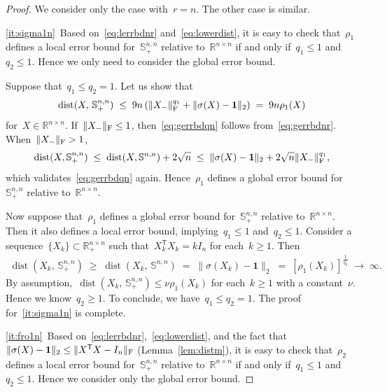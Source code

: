 \documentclass[11pt,a4paper]{article}  %
\theoremstyle{definition}
\DeclareMathOperator{\dist}{dist}
\newcommand{\RR}{\mathbb{R}}
\newcommand{\res}{\rho}
\newcommand{\col}{r}
\newcommand{\stf}[1]{\mathbb{S}^{#1}}
\newcommand{\fro}{{\scriptstyle{\textnormal{F}}}}
\newcommand{\trs}{{\scriptstyle{\mathsf{T}}}}
\newcommand{\ones}{\mathbf{1}}
\begin{document}
\begin{proof}
    We consider only the case with~$\col = n$. The other case is similar.

    \ref{it:sigma1n}~Based on~\eqref{eq:lerrbdnr} and~\eqref{eq:lowerdist}, it is easy to check
    that~$\res_1$ defines a local error bound for~$\stf{n,n}_+$ relative to~$\RR^{n\times n}$
    if and only if~$q_1 \le 1$ and~$q_2\le 1$.
    Hence we only need to consider the global error bound.

    Suppose that~$q_1 \le q_2 = 1$. Let us show that
    \begin{equation}
        \label{eq:gerrbdqn}
        \dist(X,\, \stf{n,n}_+)
        \;\le\; 9n\left( \|X_{-}\|_\fro^{q_1} + \|\sigma(X) -\ones\|_2 \right)
        \;=\; 9n\res_1(X)
    \end{equation}
    for~$X\in\RR^{n\times n}$.
    If~$\|X_{-}\|_\fro \le 1$, then~\eqref{eq:gerrbdqn} follows from~\eqref{eq:gerrbdnr}.
    When~$\|X_{-}\|_\fro > 1$,
    \begin{equation}
        \nonumber
        \dist(X, \stf{n, n}_+)
        \;\le\; \dist(X, \stf{n, n})  + 2\sqrt{n}
        \;\le\; \|\sigma(X) -\ones\|_2 + 2\sqrt{n}\|X_{-}\|_\fro^{q_1},
    \end{equation}
    which validates~\eqref{eq:gerrbdqn} again.
    Hence~$\res_1$ defines a global error bound for~$\stf{n,n}_+$ relative to~$\RR^{n\times n}$.

    Now suppose that~$\res_1$ defines a global error bound for~$\stf{n,n}_+$ relative
    to~$\RR^{n\times n}$. Then it also defines a local error bound, implying~$q_1 \le 1$ and~$q_2\le 1$.
    Consider a sequence~$\{X_k\}\subset \RR^{n\times n}_+$ such that~$X_k^\trs X_k = kI_n$
    for each~$k\ge 1$. Then
    \begin{align*}
                \dist(X_k,\, \stf{n,n}_+) \;\ge\;
        \dist(X_k, \, \stf{n, n}) \;=\; \|\sigma(X_k) -\ones\|_2 \;=\; [\res_1(X_k)]
        ^{\frac{1}{q_2}} \;\to\; \infty.
    \end{align*}
    By assumption,~$\dist(X_k,\, \stf{n,n}_+)\le \nu \res_1(X_k)$ for each~$k\ge 1$ with a constant~$\nu$.
    Hence we know~$q_2 \ge 1$. To conclude, we have~$q_1 \le q_2 = 1$.
    The proof for~\ref{it:sigma1n} is complete.

    \ref{it:fro1n}~Based on~\eqref{eq:lerrbdnr},~\eqref{eq:lowerdist},
    and the fact that~$\|\sigma(X) -\ones\|_2\le\|X^\trs X - I_n\|_\fro$ (Lemma~\ref{lem:distm}),
    it is easy to check that~$\res_2$ defines a local error bound for~$\stf{n,n}_+$ relative
    to~$\RR^{n\times n}$ if and only if~$q_1 \le 1$ and~$q_2 \le 1$.
     Hence we consider only the global error bound.


\end{proof}
\end{document}
